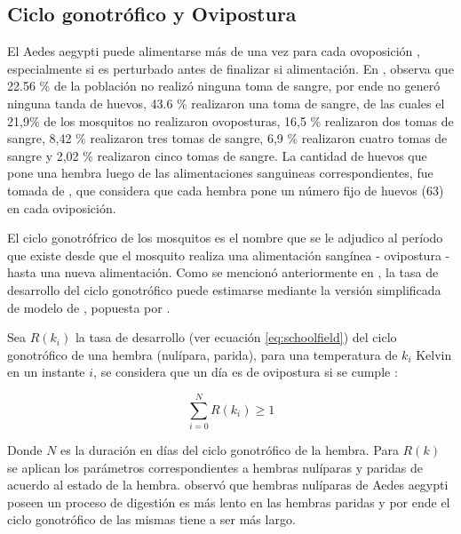 \subsection{Ciclo gonotrófico y Ovipostura}
\label{subsec:cap4-ciclo-gontrofico-ovipostura}
El Aedes aegypti puede alimentarse más de una vez para cada ovoposición \citet{scott1993detection},
especialmente si es perturbado antes de finalizar si alimentación. En \citet{osoriopontificia},
observa que  22.56 \% de la población no realizó ninguna toma de sangre, por ende no generó
ninguna tanda de huevos,  43.6 \% realizaron una toma de sangre, de las cuales el 21,9\% de los
mosquitos no realizaron ovoposturas, 16,5 \% realizaron dos tomas de sangre, 8,42 \% realizaron
tres tomas de sangre, 6,9 \% realizaron cuatro tomas de sangre y 2,02 \% realizaron cinco tomas de
sangre. La cantidad de huevos que pone una hembra luego de las alimentaciones sanguineas
correspondientes, fue tomada de \citet{otero2006stochastic}, que considera que cada hembra pone un
número fijo de huevos (63) en cada oviposición.

El ciclo gonotrófrico de los mosquitos es el nombre que se le adjudico al período que existe desde
que el mosquito realiza una alimentación sangínea - ovipostura - hasta una nueva alimentación.
Como se mencionó anteriormente en , la tasa de desarrollo
del ciclo gonotrófico puede estimarse mediante la versión simplificada de modelo de
\citet{sharpe1977reaction}, popuesta por \citet{schoolfield1981non}.

Sea $R(k_{i})$ la tasa de desarrollo (ver ecuación \eqref{eq:schoolfield}) del ciclo gonotrófico
de una hembra (nulípara, parida), para una temperatura de $k_{i}$ Kelvin en un instante $i$, se considera que un día
es de ovipostura si se cumple :

\begin{equation}
\label{eq:ciclo-gonotrofico-ovipostura}
    \sum_{i=0}^{N} R(k_{i}) \geq 1
\end{equation}

Donde $N$ es la duración en días del ciclo gonotrófico de la hembra. Para $R(k)$ se aplican los
parámetros correspondientes a hembras nulíparas y paridas de acuerdo al estado de la hembra.
\cite{edman1987host} observó que hembras nulíparas de Aedes aegypti poseen un proceso de digestión
es más lento en las hembras paridas y por ende el ciclo gonotrófico de las mismas tiene a ser más
largo.

